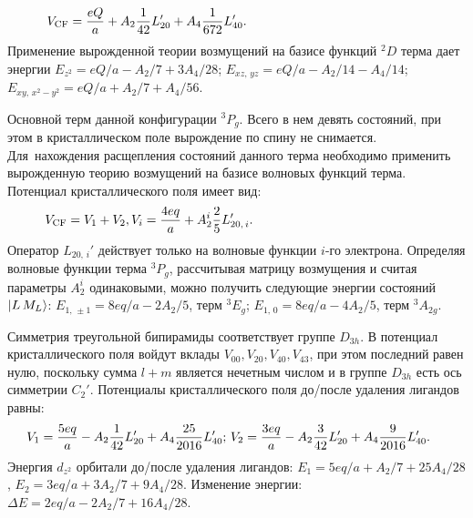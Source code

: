 \begin{equation*}
\begin{aligned}
& V_{\text{CF}}= \dfrac{eQ}{a} + A_2 \dfrac{1}{42}L_{20}' + A_4 \dfrac{1 }{672}L_{40}'. \hspace{46mm}
\end{aligned}
\end{equation*}
Применение вырожденной теории возмущений на базисе функций $^2D$ терма дает энергии $E_{z^2} = eQ/a - A_2/7 + {3A_4}/{28}$; $E_{xz,\, yz} = eQ/a -{A_2}/{14} - {A_4}/{14}$; $E_{xy,\,x^2-y^2} = eQ/a + {A_2}/{7} + {A_4}/{56}$.\par
{} Основной терм данной конфигурации $^3P_g$. Всего в нем девять состояний, при этом в кристаллическом поле вырождение по спину не снимается. Для~нахождения расщепления состояний данного терма необходимо применить вырожденную теорию возмущений на базисе волновых функций терма. Потенциал кристаллического поля имеет вид:
\begin{equation*}
\begin{aligned}
& V_{\text{CF}}= V_{1}+V_{2}, V_i = \dfrac{4eq}{a} + A_{2}^i \dfrac{2}{5}L_{20,\,i}'. \hspace{45mm}
\end{aligned}
\end{equation*}
Оператор $L_{20,\,i}'$ действует только на волновые функции $i$-го электрона. Определяя волновые функции терма $^3P_g$, рассчитывая матрицу возмущения и считая параметры $A_{2}^i$ одинаковыми, можно получить следующие энергии состояний $\ket{L\,M_L}$: $E_{1,\,\pm 1}=8eq/a-2A_2/5$, терм $^3E_g$; $E_{1,\,0}=8eq/a-4A_2/5$, терм $^3A_{2g}$.\par
{} Симметрия треугольной бипирамиды соответствует группе $D_{3h}$. В потенциал кристаллического поля войдут вклады $V_{00}\text{,}\,V_{20}\text{,}\,V_{40}\text{,}\,V_{43}$, при этом последний равен нулю, поскольку сумма $l + m $ является нечетным числом и в группе $D_{3h}$ есть ось симметрии $C_2'$. Потенциалы кристаллического поля до/после удаления лигандов равны:
\begin{equation*}
\begin{aligned}
& V_{1}= \dfrac{5eq}{a} - A_2 \dfrac{1}{42}L_{20}' + A_4 \dfrac{ 25 }{2016} L_{40}'; \, V_{2}= \dfrac{3eq}{a} - A_2 \dfrac{3}{42}L_{20}' + A_4 \dfrac{ 9 }{2016} L_{40}' . \hspace{1mm}
\end{aligned}
\end{equation*}
Энергия $d_{z^2}$ орбитали до/после удаления лигандов: $E_1= 5eq/a + {A_2}/{7} + {25A_4}/{28}$, $E_2= 3eq/a + {3A_2}/{7} + {9A_4}/{28}$. Изменение энергии: $\Delta E= 2eq/a - {2A_2}/{7} + {16A_4}/{28}$.\par
